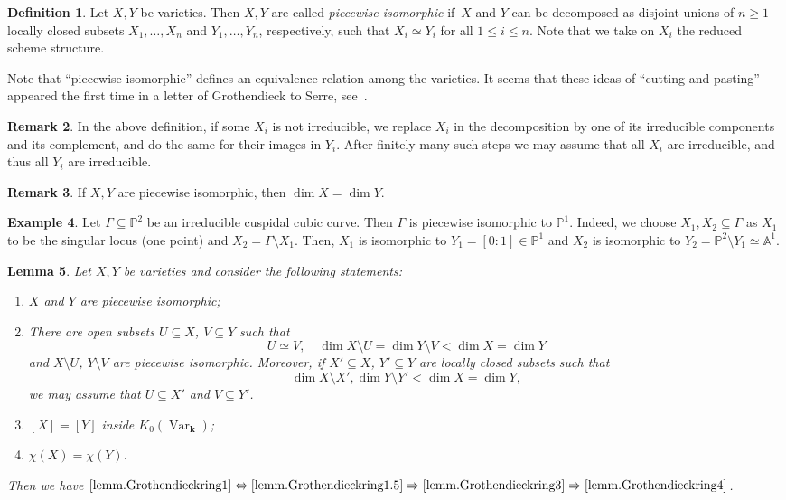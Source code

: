 \documentclass[JEP,XML,SOM,Unicode,NoFloatCountersInSection,published]{cedram}
\newtheorem{lemma}{Lemma}[section]
\theoremstyle{definition}
\newtheorem{definition}[lemma]{Definition}
\newtheorem{remark}[lemma]{Remark}
\newtheorem{example}[lemma]{Example}
\newcommand\A{{\mathbb A}}\let\AA\A
\renewcommand\k{{\mathbf k}}
\newcommand\p{{\mathbb P}}\let\PP\p
\DeclareMathOperator{\Var}{Var}
\begin{document}
\begin{definition}
\label{Def.piecewise_isomorphic}
Let $X, Y$ be varieties. Then $X, Y$ are called \emph{piecewise isomorphic} if~$X$ and $Y$
can be decomposed as disjoint unions of $n \geq 1$ locally closed subsets $X_1, \ldots, X_n$ and
$Y_1, \ldots, Y_n$, respectively, such that $X_i \simeq Y_i$ for all $1 \leq i \leq n$.
Note that we take on $X_i$ the reduced scheme structure.
\end{definition}

Note that ``piecewise isomorphic'' defines an equivalence relation among the varieties.
It seems that these ideas of ``cutting and pasting'' appeared the first time in a letter
of Grothendieck to Serre, see~\cite[Letter from 16.8.1964]{2001Correspondance-Gro}.

\begin{remark}\label{Rem:PWirr}
In the above definition, if some $X_i$ is not irreducible, we replace $X_i$ in the decomposition by one of its irreducible components and its complement, and do the same for their images in $Y_i$. After finitely many such steps we may assume that all $X_i$ are irreducible, and thus all $Y_i$ are irreducible.
\end{remark}

\begin{remark}
If $X, Y$ are piecewise isomorphic, then $\dim X = \dim Y$.
\end{remark}

\begin{example}
Let $\Gamma\subseteq \p^2$ be an irreducible cuspidal cubic curve. Then $\Gamma$ is piecewise isomorphic to $\p^1$. Indeed, we choose $X_1,X_2\subseteq \Gamma$ as $X_1$ to be the singular locus (one point) and $X_2=\Gamma\setminus X_1$. Then, $X_1$ is isomorphic to $Y_1=[0:1]\in \p^1$ and $X_2$ is isomorphic to $Y_2=\p^2\setminus Y_1\simeq \A^1$.
\end{example}

\begin{lemma}
\label{lemm.Grothendieckring}
Let $X, Y$ be varieties and consider the following statements:
\begin{enumerate}
\item \label{lemm.Grothendieckring1} $X$ and $Y$ are piecewise isomorphic;
\item \label{lemm.Grothendieckring1.5}
There are open subsets $U \subseteq X$, $V \subseteq Y$ such that
\[
U \simeq V,\quad \dim X\setminus U=\dim Y\setminus V< \dim X=\dim Y
\]
and $X \setminus U$, $Y \setminus V$ are piecewise isomorphic.
Moreover, if $X' \subseteq X$, $Y' \subseteq Y$ are locally closed subsets such that
\[
\dim X \setminus X', \dim Y \setminus Y' < \dim X = \dim Y,
\]
we may assume that $U \subseteq X'$ and $V \subseteq Y'$.
\item \label{lemm.Grothendieckring3} $[X] = [Y]$ inside $K_0(\Var_\k)$;
\item \label{lemm.Grothendieckring4} $\chi(X) = \chi(Y)$.
\end{enumerate}
Then we have $\eqref{lemm.Grothendieckring1} \Leftrightarrow \eqref{lemm.Grothendieckring1.5}
\Rightarrow \eqref{lemm.Grothendieckring3} \Rightarrow \eqref{lemm.Grothendieckring4}$.
\end{lemma}
\end{document}
